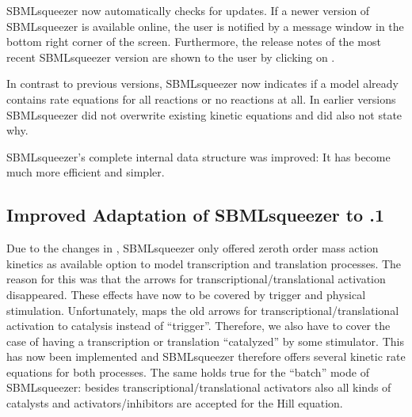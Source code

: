 \begin{dinglist}{52}
\item SBMLsqueezer now automatically checks for updates. If a newer version of
SBMLsqueezer is available online, the user is notified by a message window in
the bottom right corner of the screen. Furthermore, the release notes of the
most recent SBMLsqueezer version are shown to the user by clicking on .

\item In contrast to previous versions, SBMLsqueezer now indicates if a model already
contains rate equations for all reactions or no reactions at all. In earlier
versions SBMLsqueezer did not overwrite existing kinetic equations and did also
not state why.

\item SBMLsqueezer's complete internal data structure was improved: It has become much
more efficient and simpler.
\end{dinglist}

\subsection{Improved Adaptation of SBMLsqueezer to .1}

Due to the changes in \CellDesigner, SBMLsqueezer only offered zeroth order mass
action kinetics as available option to model transcription and translation
processes. The reason for this was that the arrows for
transcriptional/translational activation disappeared. These effects have now to
be covered by trigger and physical stimulation. Unfortunately, \CellDesigner maps
the old arrows for transcriptional/translational activation to catalysis instead
of ``trigger''. Therefore, we also have to cover the case of having a
transcription or translation ``catalyzed'' by some stimulator. This has now been
implemented and SBMLsqueezer therefore offers several kinetic rate equations for
both processes. The same holds true for the ``batch'' mode of SBMLsqueezer:
besides transcriptional/translational activators also all kinds of catalysts and
activators/inhibitors are accepted for the Hill equation.

